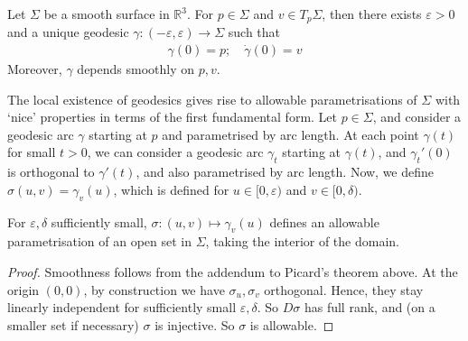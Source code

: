 \begin{corollary} \label{cor:3.4}
	Let $\Sigma$ be a smooth surface in $\mathbb R^3$.
	For $p \in \Sigma$ and $v \in T_p \Sigma$, then there exists $\varepsilon > 0$ and a unique geodesic $\gamma \colon (-\varepsilon, \varepsilon) \to \Sigma$ such that
	\begin{align*}
		\gamma(0) = p;\quad \dot \gamma(0) = v
	\end{align*}
	Moreover, $\gamma$ depends smoothly on $p,v$.
\end{corollary}

The local existence of geodesics gives rise to allowable parametrisations of $\Sigma$ with `nice' properties in terms of the first fundamental form.
Let $p \in \Sigma$, and consider a geodesic arc $\gamma$ starting at $p$ and parametrised by arc length.
At each point $\gamma(t)$ for small $t > 0$, we can consider a geodesic arc $\gamma_t$ starting at $\gamma(t)$, and $\gamma_t'(0)$ is orthogonal to $\gamma'(t)$, and also parametrised by arc length.
Now, we define $\sigma(u,v) = \gamma_v(u)$, which is defined for $u \in [0,\varepsilon)$ and $v \in [0,\delta)$.

\begin{lemma}
	For $\varepsilon, \delta$ sufficiently small, $\sigma \colon (u,v) \mapsto \gamma_v(u)$ defines an allowable parametrisation of an open set in $\Sigma$, taking the interior of the domain.
\end{lemma}

\begin{proof}
	Smoothness follows from the addendum to Picard's theorem above.
	At the origin $(0,0)$, by construction we have $\sigma_u, \sigma_v$ orthogonal.
	Hence, they stay linearly independent for sufficiently small $\varepsilon, \delta$.
	So $D\sigma$ has full rank, and (on a smaller set if necessary) $\sigma$ is injective.
	So $\sigma$ is allowable.
\end{proof}


